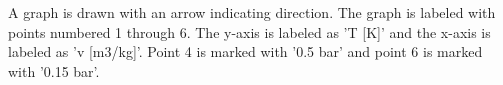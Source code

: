 A graph is drawn with an arrow indicating direction. The graph is labeled with points numbered 1 through 6. The y-axis is labeled as 'T [K]' and the x-axis is labeled as 'v [m3/kg]'. Point 4 is marked with '0.5 bar' and point 6 is marked with '0.15 bar'.